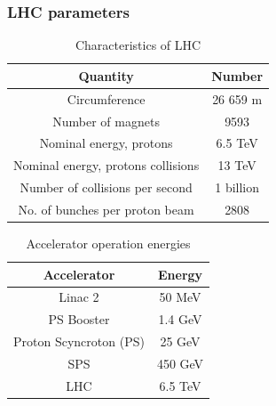 \documentclass[11pt]{beamer}
\begin{document}
\begin{frame}
\frametitle{LHC parameters}
\begin{minipage}[c]{0.48\textwidth}
	\tiny
\begin{table}
	\caption*{Characteristics of LHC}
\centering
\begin{tabular}{|c|c|}
			\hline
			Quantity & Number \\
			\hline
			Circumference &  26 659 m \\
			\hline
			Number of magnets& 9593 \\
			\hline
			Nominal energy, protons & 6.5 TeV\\
			\hline
			Nominal energy, protons collisions &  13 TeV\\
			\hline
			Number of collisions per second &1 billion\\
			\hline
			No. of bunches per proton beam &  2808\\
			\hline
\end{tabular}
\end{table}
\end{minipage}
\hfill
\begin{minipage}[c]{0.48\textwidth}
	\tiny
	\begin{table}
		\centering
		\caption*{Accelerator operation energies}
		\begin{tabular}{|c|c|}
			\hline
			Accelerator & Energy \\
			\hline
			Linac 2 &  50 MeV \\
			\hline
			PS Booster & 1.4 GeV \\
			\hline
			Proton Scyncroton (PS) & 25 GeV\\
			\hline
			SPS &  450 GeV\\
			\hline
			LHC & 6.5 TeV\\
			\hline
		\end{tabular}
	\end{table}
\end{minipage}
\end{frame}
\end{document}
